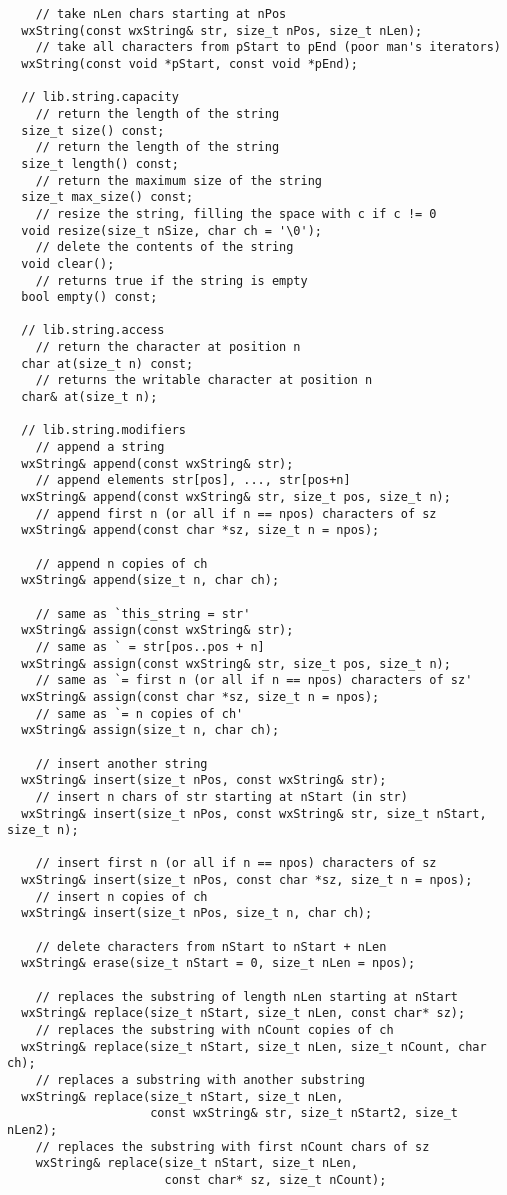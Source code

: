\begin{verbatim}
    // take nLen chars starting at nPos
  wxString(const wxString& str, size_t nPos, size_t nLen);
    // take all characters from pStart to pEnd (poor man's iterators)
  wxString(const void *pStart, const void *pEnd);

  // lib.string.capacity
    // return the length of the string
  size_t size() const;
    // return the length of the string
  size_t length() const;
    // return the maximum size of the string
  size_t max_size() const;
    // resize the string, filling the space with c if c != 0
  void resize(size_t nSize, char ch = '\0');
    // delete the contents of the string
  void clear();
    // returns true if the string is empty
  bool empty() const;

  // lib.string.access
    // return the character at position n
  char at(size_t n) const;
    // returns the writable character at position n
  char& at(size_t n);

  // lib.string.modifiers
    // append a string
  wxString& append(const wxString& str);
    // append elements str[pos], ..., str[pos+n]
  wxString& append(const wxString& str, size_t pos, size_t n);
    // append first n (or all if n == npos) characters of sz
  wxString& append(const char *sz, size_t n = npos);

    // append n copies of ch
  wxString& append(size_t n, char ch);

    // same as `this_string = str'
  wxString& assign(const wxString& str);
    // same as ` = str[pos..pos + n]
  wxString& assign(const wxString& str, size_t pos, size_t n);
    // same as `= first n (or all if n == npos) characters of sz'
  wxString& assign(const char *sz, size_t n = npos);
    // same as `= n copies of ch'
  wxString& assign(size_t n, char ch);

    // insert another string
  wxString& insert(size_t nPos, const wxString& str);
    // insert n chars of str starting at nStart (in str)
  wxString& insert(size_t nPos, const wxString& str, size_t nStart, size_t n);

    // insert first n (or all if n == npos) characters of sz
  wxString& insert(size_t nPos, const char *sz, size_t n = npos);
    // insert n copies of ch
  wxString& insert(size_t nPos, size_t n, char ch);

    // delete characters from nStart to nStart + nLen
  wxString& erase(size_t nStart = 0, size_t nLen = npos);

    // replaces the substring of length nLen starting at nStart
  wxString& replace(size_t nStart, size_t nLen, const char* sz);
    // replaces the substring with nCount copies of ch
  wxString& replace(size_t nStart, size_t nLen, size_t nCount, char ch);
    // replaces a substring with another substring
  wxString& replace(size_t nStart, size_t nLen,
                    const wxString& str, size_t nStart2, size_t nLen2);
    // replaces the substring with first nCount chars of sz
    wxString& replace(size_t nStart, size_t nLen,
                      const char* sz, size_t nCount);


\end{verbatim}
